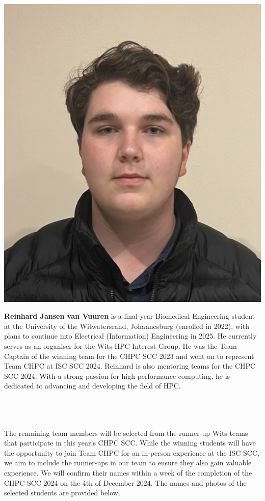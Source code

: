 \documentclass[10pt, onecolumn]{IEEEtran}
\begin{document}
\begin{minipage}{0.2\textwidth}
  \includegraphics[width=\textwidth]{reinhard_bio.png}
\end{minipage}
\hspace{0.02\textwidth} %
\begin{minipage}{0.65\textwidth}
\textbf{Reinhard Jansen van Vuuren} is a final-year Biomedical Engineering student at the University of the Witwatersrand, Johannesburg (enrolled in 2022), with plans to continue into Electrical (Information) Engineering in 2025. He currently serves as an organiser for the Wits HPC Interest Group. He was the Team Captain of the winning team for the CHPC SCC 2023 and went on to represent Team CHPC at ISC SCC 2024. Reinhard is also mentoring teams for the CHPC SCC 2024. With a strong passion for high-performance computing, he is dedicated to advancing and developing the field of HPC.
\end{minipage}
\\\\\\
\noindent
The remaining team members will be selected from the runner-up Wits teams that participate in this year's CHPC SCC. While the winning students will have the opportunity to join Team CHPC for an in-person experience at the ISC SCC, we aim to include the runner-ups in our team to ensure they also gain valuable experience. We will confirm their names within a week of the completion of the CHPC SCC 2024 on the 4th of December 2024. The names and photos of the selected students are provided below.
\end{document}
